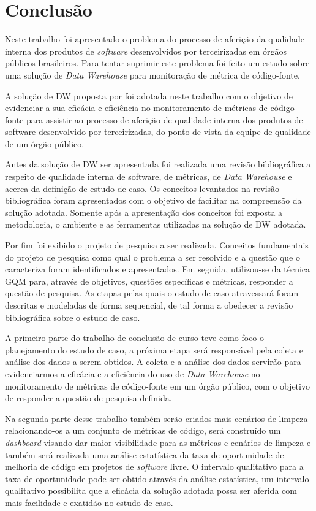 \chapter{Conclusão}

Neste trabalho foi apresentado o problema do processo de aferição da qualidade interna dos produtos de \textit{software} desenvolvidos por terceirizadas em órgãos públicos brasileiros. Para tentar suprimir este problema foi feito um estudo sobre uma solução de \textit{Data Warehouse} para monitoração de métrica de código-fonte.

A solução de DW proposta por  foi adotada neste trabalho com o objetivo de evidenciar a sua eficácia e eficiência no monitoramento de métricas de código-fonte para assistir ao processo de aferição de qualidade interna dos produtos de software desenvolvido por terceirizadas, do ponto de vista da equipe de qualidade de um órgão público. 

Antes da solução de DW ser apresentada foi realizada uma revisão bibliográfica a respeito de qualidade interna de software, de métricas, de \textit{Data Warehouse} e acerca da definição de estudo de caso. Os conceitos levantados na revisão bibliográfica foram apresentados com o objetivo de facilitar na compreensão da solução adotada. Somente após  a apresentação dos conceitos foi exposta a metodologia, o ambiente e as ferramentas utilizadas na solução de DW adotada. 

Por fim foi  exibido o projeto de pesquisa a ser realizada. Conceitos fundamentais do projeto de pesquisa como qual o problema a ser resolvido e a questão que o caracteriza foram identificados e apresentados. Em seguida, utilizou-se da  técnica GQM para, através de objetivos, questões específicas e métricas, responder a questão de pesquisa. As etapas pelas quais o estudo de caso atravessará foram descritas e modeladas de forma sequencial, de tal forma a obedecer a revisão bibliográfica sobre o estudo de caso.

A primeiro parte do trabalho de conclusão de curso teve como foco o planejamento do estudo de caso, a próxima etapa será responsável pela coleta e análise dos dados a serem obtidos. A coleta e a análise dos dados servirão para evidenciarmos a eficácia e a eficiência do uso de \textit{Data Warehouse} no monitoramento de métricas de código-fonte em um órgão público, com o objetivo de responder a questão de pesquisa definida.

Na segunda parte desse trabalho também serão criados mais cenários de limpeza relacionando-os a um conjunto de métricas de código, será construído um \textit{dashboard} visando dar maior visibilidade para as métricas e cenários de limpeza e também será realizada uma análise estatística da taxa de oportunidade de melhoria de código em projetos de \textit{software} livre. O intervalo qualitativo para a taxa de oportunidade pode ser obtido através da análise estatística, um intervalo qualitativo possibilita que a eficácia da solução adotada possa ser aferida com mais facilidade e exatidão no estudo de caso.   